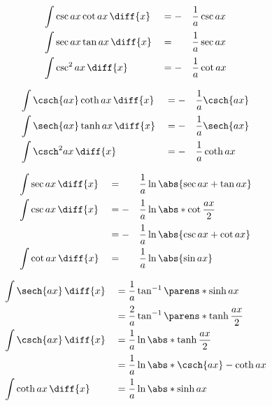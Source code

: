 \begin{myminipage}[t]{0.5\linewidth}
    \begin{HackEquationLeftAlign}
    \begin{alignat*}{3}
        &\int{\csc{ax} \cot{ax} \,\diff{x}} &&= -&& \frac{1}{a} \csc{ax} \\
        &\int{\sec{ax} \tan{ax} \,\diff{x}} &&= && \frac{1}{a} \sec{ax} \\
        &\int{\csc^2{ax} \,\diff{x}} &&= -&& \frac{1}{a} \cot{ax}
    \end{alignat*}
    \end{HackEquationLeftAlign}%
\end{myminipage}%
\begin{myminipage}[t]{0.5\linewidth}
    \begin{HackEquationLeftAlign}
    \begin{alignat*}{3}
        &\int{\csch{ax} \coth{ax} \,\diff{x}} &&= -&& \frac{1}{a} \csch{ax} \\
        &\int{\sech{ax} \tanh{ax} \,\diff{x}} &&= -&& \frac{1}{a} \sech{ax} \\
        &\int{\csch^2{ax} \,\diff{x}} &&= -&& \frac{1}{a} \coth{ax}
    \end{alignat*}
    \end{HackEquationLeftAlign}%
\end{myminipage}


\begin{myminipage}[t]{0.5\linewidth}
    \begin{HackEquationLeftAlign}
    \begin{alignat*}{3}
        &\int{\sec{ax} \,\diff{x}} &&= && \frac{1}{a} \ln{\abs{\sec{ax} + \tan{ax}}} \\
        &\int{\csc{ax} \,\diff{x}} &&= -&& \frac{1}{a} \ln{\abs*{\cot{\frac{ax}{2}}}} \\
        & &&= -&& \frac{1}{a} \ln{\abs{\csc{ax} + \cot{ax}}} \\
        &\int{\cot{ax} \,\diff{x}} &&= && \frac{1}{a} \ln{\abs{\sin{ax}}}
    \end{alignat*}
    \end{HackEquationLeftAlign}%
\end{myminipage}%
\begin{myminipage}[t]{0.5\linewidth}
    \begin{HackEquationLeftAlign}
    \begin{alignat*}{3}
        &\int{\sech{ax} \,\diff{x}} &&= \frac{1}{a} \tan^{-1}{\parens*{\sinh{ax}}} \\
        & &&= \frac{2}{a} \tan^{-1}{\parens*{\tanh{\frac{ax}{2}}}} \\
        &\int{\csch{ax} \,\diff{x}} &&= \frac{1}{a} \ln{\abs*{\tanh{\frac{ax}{2}}}} \\
        & &&= \frac{1}{a} \ln{\abs*{\csch{ax} - \coth{ax}}} \\
        &\int{\coth{ax} \,\diff{x}} &&= \frac{1}{a} \ln{\abs*{\sinh{ax}}}
    \end{alignat*}
    \end{HackEquationLeftAlign}%
\end{myminipage}


